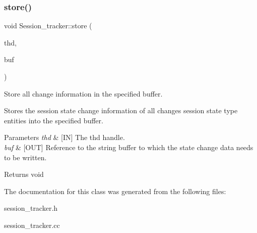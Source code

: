 \subsubsection{\texorpdfstring{store()}{store()}}
{\footnotesize\ttfamily void Session\+\_\+tracker\+::store (\begin{DoxyParamCaption}\item[{T\+HD $\ast$}]{thd,  }\item[{String \&}]{buf }\end{DoxyParamCaption})}



Store all change information in the specified buffer. 

Stores the session state change information of all changes session state type entities into the specified buffer.


\begin{DoxyParams}{Parameters}
{\em thd} & \mbox{[}IN\mbox{]} The thd handle. \\
\hline
{\em buf} & \mbox{[}O\+UT\mbox{]} Reference to the string buffer to which the state change data needs to be written.\\
\hline
\end{DoxyParams}
\begin{DoxyReturn}{Returns}
void 
\end{DoxyReturn}


The documentation for this class was generated from the following files\+:\begin{DoxyCompactItemize}
\item 
session\+\_\+tracker.\+h\item 
session\+\_\+tracker.\+cc\end{DoxyCompactItemize}
